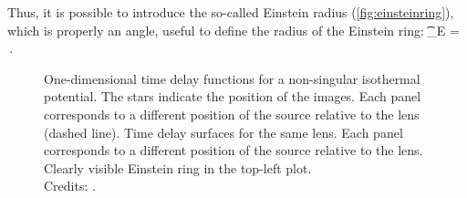 Thus, it is possible to introduce the so-called Einstein radius (\cref{fig:einsteinring}), which is properly an angle, useful to define the radius of the Einstein ring:
\be
\label{eq:2.30}
\t_E =  \,.
\ee

\begin{figure}
  \centering
  \hfill
  \caption[Time delay functions and surfaces]{\protect{} One-dimensional time delay functions for a non-singular isothermal potential. The stars indicate the position of the images. Each panel corresponds to a different position of the source relative to the lens (dashed line). \protect{} Time delay surfaces for the same lens. Each panel corresponds to a different position of the source relative to the lens. Clearly visible Einstein ring in the top-left plot.\\\small{Credits: \cite{meneghetti_introduction_2021}.}}
  \label{fig:timedelay}
\end{figure}


